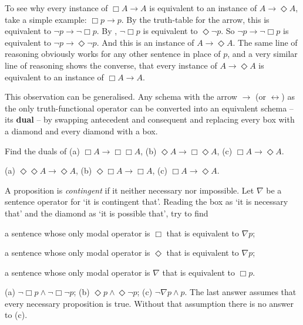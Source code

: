 To see why every instance of $\Box A \to A$ is equivalent to an instance of
$A \to \Diamond A$, take a simple example: $\Box p \to p$. By the truth-table
for the arrow, this is equivalent to $\neg p \to \neg \Box p$. By
, $\neg \Box p$ is equivalent to $\Diamond \neg p$. So
$\neg p \to \neg \Box p$ is equivalent to $\neg p \to \Diamond \neg p$. And this
is an instance of $A \to \Diamond A$. The same line of reasoning obviously works
for any other sentence in place of $p$, and a very similar line of reasoning
shows the converse, that every instance of $A \to \Diamond A$ is equivalent to
an instance of $\Box A \to A$.

This observation can be generalised. Any schema with the arrow $\to$ (or
$\leftrightarrow$) as the only truth-functional operator can be converted into
an equivalent schema -- its \textbf{dual} -- by swapping antecedent and
consequent and replacing every box with a diamond and every diamond with a box.


\begin{exercise}
 Find the duals of (a) $\Box A \to \Box\Box A$, (b) $\Diamond A \to \Box\Diamond A$, (c) $\Box A \to \Diamond A$.
\end{exercise}
\begin{solution}
  (a) $\Diamond\Diamond A \to \Diamond A$, (b) $\Diamond\Box A \to \Box A$, (c)
  $\Box A \to \Diamond A$.
\end{solution}

\begin{exercise}
  A proposition is \emph{contingent} if it neither necessary nor impossible. Let
  $\nabla$ be a sentence operator for `it is contingent that'. Reading the box as `it is necessary that' and the diamond as `it is possible that', try to find
  \begin{exlist}
    \item a sentence whose only modal operator is $\Box$ that is equivalent to
    $\nabla p$;
    \item a sentence whose only modal operator is $\Diamond$ that is equivalent to
    $\nabla p$;
    \item a sentence whose only modal operator is $\nabla$ that is equivalent to $\Box p$.
  \end{exlist}
\end{exercise}
\begin{solution}
  (a) $\neg \Box p \land \neg\Box\neg p$; (b)
  $\Diamond p \land \Diamond \neg p$; (c) $\neg\nabla p \land p$. The last
  answer assumes that every necessary proposition is true. Without that
  assumption there is no answer to (c). %
\end{solution}


